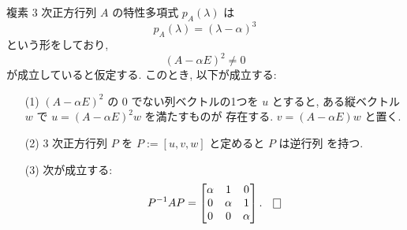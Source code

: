 \documentclass[12pt,twoside]{jarticle}
\begin{document}
\begin{question}[15点]
  \label{q:normal-form-3.4}
  複素 $3$ 次正方行列 $A$ の特性多項式 $p_A(\lambda)$ は
  \begin{equation*}
    p_A(\lambda) = (\lambda - \alpha)^3
  \end{equation*}
  という形をしており,
  \begin{equation*}
    (A - \alpha E)^2 \ne 0
  \end{equation*}
  が成立していると仮定する.  このとき, 以下が成立する:
  \begin{enumerate}
  \item[(1)] $(A - \alpha E)^2$ の $0$ でない列ベクトルの1つを $u$ とすると, 
    ある縦ベクトル $w$ で $u = (A - \alpha E)^2 w$ を満たすものが
    存在する.  $v = (A - \alpha E)w$ と置く.
  \item[(2)] $3$ 次正方行列 $P$ を $P := [u, v, w]$ と定めると $P$ は逆行列
    を持つ. 
  \item[(3)] 次が成立する:
    \begin{equation*}
      P^{-1} A P 
      = 
      \begin{bmatrix}
        \alpha & 1 & 0 \\
        0 & \alpha & 1 \\
        0 & 0 & \alpha \\
      \end{bmatrix}.
      \qed
    \end{equation*}
  \end{enumerate}
\end{question}

\end{document}
